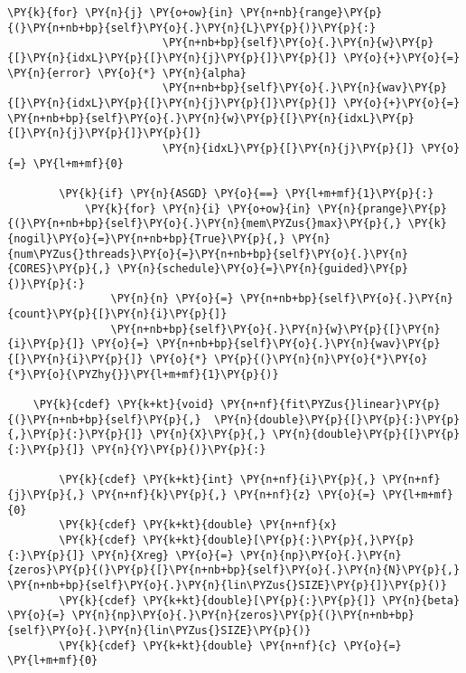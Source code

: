 \begin{Verbatim}[commandchars=\\\{\}]
                    \PY{k}{for} \PY{n}{j} \PY{o+ow}{in} \PY{n+nb}{range}\PY{p}{(}\PY{n+nb+bp}{self}\PY{o}{.}\PY{n}{L}\PY{p}{)}\PY{p}{:}
                        \PY{n+nb+bp}{self}\PY{o}{.}\PY{n}{w}\PY{p}{[}\PY{n}{idxL}\PY{p}{[}\PY{n}{j}\PY{p}{]}\PY{p}{]} \PY{o}{+}\PY{o}{=} \PY{n}{error} \PY{o}{*} \PY{n}{alpha}
                        \PY{n+nb+bp}{self}\PY{o}{.}\PY{n}{wav}\PY{p}{[}\PY{n}{idxL}\PY{p}{[}\PY{n}{j}\PY{p}{]}\PY{p}{]} \PY{o}{+}\PY{o}{=} \PY{n+nb+bp}{self}\PY{o}{.}\PY{n}{w}\PY{p}{[}\PY{n}{idxL}\PY{p}{[}\PY{n}{j}\PY{p}{]}\PY{p}{]}
                        \PY{n}{idxL}\PY{p}{[}\PY{n}{j}\PY{p}{]} \PY{o}{=} \PY{l+m+mf}{0}

        \PY{k}{if} \PY{n}{ASGD} \PY{o}{==} \PY{l+m+mf}{1}\PY{p}{:}           
            \PY{k}{for} \PY{n}{i} \PY{o+ow}{in} \PY{n}{prange}\PY{p}{(}\PY{n+nb+bp}{self}\PY{o}{.}\PY{n}{mem\PYZus{}max}\PY{p}{,} \PY{k}{nogil}\PY{o}{=}\PY{n+nb+bp}{True}\PY{p}{,} \PY{n}{num\PYZus{}threads}\PY{o}{=}\PY{n+nb+bp}{self}\PY{o}{.}\PY{n}{CORES}\PY{p}{,} \PY{n}{schedule}\PY{o}{=}\PY{n}{guided}\PY{p}{)}\PY{p}{:}
                \PY{n}{n} \PY{o}{=} \PY{n+nb+bp}{self}\PY{o}{.}\PY{n}{count}\PY{p}{[}\PY{n}{i}\PY{p}{]}
                \PY{n+nb+bp}{self}\PY{o}{.}\PY{n}{w}\PY{p}{[}\PY{n}{i}\PY{p}{]} \PY{o}{=} \PY{n+nb+bp}{self}\PY{o}{.}\PY{n}{wav}\PY{p}{[}\PY{n}{i}\PY{p}{]} \PY{o}{*} \PY{p}{(}\PY{n}{n}\PY{o}{*}\PY{o}{*}\PY{o}{\PYZhy{}}\PY{l+m+mf}{1}\PY{p}{)}
    
    \PY{k}{cdef} \PY{k+kt}{void} \PY{n+nf}{fit\PYZus{}linear}\PY{p}{(}\PY{n+nb+bp}{self}\PY{p}{,}  \PY{n}{double}\PY{p}{[}\PY{p}{:}\PY{p}{,}\PY{p}{:}\PY{p}{]} \PY{n}{X}\PY{p}{,} \PY{n}{double}\PY{p}{[}\PY{p}{:}\PY{p}{]} \PY{n}{Y}\PY{p}{)}\PY{p}{:}

        \PY{k}{cdef} \PY{k+kt}{int} \PY{n+nf}{i}\PY{p}{,} \PY{n+nf}{j}\PY{p}{,} \PY{n+nf}{k}\PY{p}{,} \PY{n+nf}{z} \PY{o}{=} \PY{l+m+mf}{0}
        \PY{k}{cdef} \PY{k+kt}{double} \PY{n+nf}{x}
        \PY{k}{cdef} \PY{k+kt}{double}[\PY{p}{:}\PY{p}{,}\PY{p}{:}\PY{p}{]} \PY{n}{Xreg} \PY{o}{=} \PY{n}{np}\PY{o}{.}\PY{n}{zeros}\PY{p}{(}\PY{p}{[}\PY{n+nb+bp}{self}\PY{o}{.}\PY{n}{N}\PY{p}{,} \PY{n+nb+bp}{self}\PY{o}{.}\PY{n}{lin\PYZus{}SIZE}\PY{p}{]}\PY{p}{)}
        \PY{k}{cdef} \PY{k+kt}{double}[\PY{p}{:}\PY{p}{]} \PY{n}{beta} \PY{o}{=} \PY{n}{np}\PY{o}{.}\PY{n}{zeros}\PY{p}{(}\PY{n+nb+bp}{self}\PY{o}{.}\PY{n}{lin\PYZus{}SIZE}\PY{p}{)}
        \PY{k}{cdef} \PY{k+kt}{double} \PY{n+nf}{c} \PY{o}{=} \PY{l+m+mf}{0}


\end{Verbatim}
